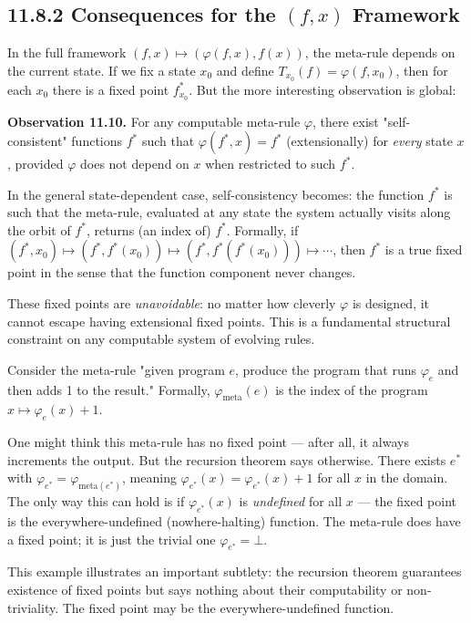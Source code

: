 \subsection{11.8.2 Consequences for the $(f, x)$ Framework}

In the full framework $(f, x) \mapsto (\varphi(f, x), f(x))$, the meta-rule depends on the current state. If we fix a state $x_0$ and define $T_{x_0}(f) = \varphi(f, x_0)$, then for each $x_0$ there is a fixed point $f^*_{x_0}$. But the more interesting observation is global:

\textbf{Observation 11.10.} For any computable meta-rule $\varphi$, there exist "self-consistent" functions $f^*$ such that $\varphi(f^*, x) = f^*$ (extensionally) for \textit{every} state $x$, provided $\varphi$ does not depend on $x$ when restricted to such $f^*$.

In the general state-dependent case, self-consistency becomes: the function $f^*$ is such that the meta-rule, evaluated at any state the system actually visits along the orbit of $f^*$, returns (an index of) $f^*$. Formally, if $(f^*, x_0) \mapsto (f^*, f^*(x_0)) \mapsto (f^*, f^*(f^*(x_0))) \mapsto \cdots$, then $f^*$ is a true fixed point in the sense that the function component never changes.

These fixed points are \textit{unavoidable}: no matter how cleverly $\varphi$ is designed, it cannot escape having extensional fixed points. This is a fundamental structural constraint on any computable system of evolving rules.

\begin{example}
Consider the meta-rule "given program $e$, produce the program that runs $\varphi_e$ and then adds 1 to the result." Formally, $\varphi_{\text{meta}}(e)$ is the index of the program $x \mapsto \varphi_e(x) + 1$.

One might think this meta-rule has no fixed point --- after all, it always increments the output. But the recursion theorem says otherwise. There exists $e^*$ with $\varphi_{e^*} = \varphi_{\text{meta}(e^*)}$, meaning $\varphi_{e^*}(x) = \varphi_{e^*}(x) + 1$ for all $x$ in the domain. The only way this can hold is if $\varphi_{e^*}(x)$ is \textit{undefined} for all $x$ --- the fixed point is the everywhere-undefined (nowhere-halting) function. The meta-rule does have a fixed point; it is just the trivial one $\varphi_{e^*} = \bot$.

This example illustrates an important subtlety: the recursion theorem guarantees existence of fixed points but says nothing about their computability or non-triviality. The fixed point may be the everywhere-undefined function.
\end{example}


